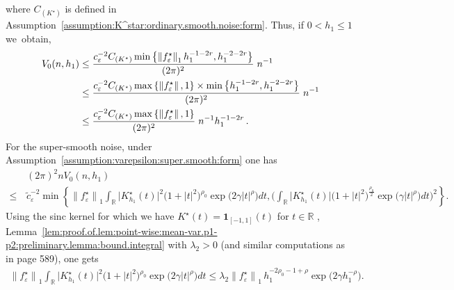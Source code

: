 \documentclass[11pt,a4paper,openany]{article}
\def\R{\mathbb{R}}
\def\r{{r}}
\begin{document}
where $C_{(K^{\star})}$ is defined in Assumption~\ref{assumption:K^star:ordinary.smooth.noise:form}. 
Thus, if $0  <  h_{1}  \leq  1$ we~obtain,   
\begin{align*}
	V_{0}(n,h_{1})  &\leq  \dfrac{   c_{\varepsilon}^{-2}     C_{(K^{\star})}  \min \left\{  \left\| f_{\varepsilon}^{\star}   \right\|_{1}   h_{1}^{-1-2r},    h_{1}^{-2-2r}    \right\}    }{(2\pi)^{2}}   \hspace{0.1cm}    n^{-1}     
	\\   
	&\leq  \dfrac{   c_{\varepsilon}^{-2}     C_{(K^{\star})}  \max \left\{  \left\| f_{\varepsilon}^{\star} \right\|, 1  \right\}  \times  \min \left\{  h_{1}^{-1-2r},    h_{1}^{-2-2r}    \right\}    }{(2\pi)^{2}} \hspace{0.1cm}  n^{-1}   
	\\   
	&\leq  \dfrac{   c_{\varepsilon}^{-2}     C_{(K^{\star})}  \max \left\{  \left\| f_{\varepsilon}^{\star} \right\|, 1  \right\}  }{(2\pi)^{2}} \hspace{0.1cm}  n^{-1} h_{1}^{-1 - 2\r} 
	\,   .                                                                                                                                                                       
\end{align*}
 For the super-smooth noise, under Assumption~\eqref{assumption:varepsilon:super.smooth:form} one has  
\begin{align*}
		&(2\pi)^{2}  n   V_{0}(n,h_{1}) 
		\\
		\leq  \,    &\widetilde{c}_{\varepsilon}^{-2} \min \left\{  \left\| f_{\varepsilon}^{\star} \right\|_{1}  \int_{\R} \big| K_{h_{1}}^{\star}(t) \big|^{2} \big( 1 + |t|^{ 2 } \big)^{\rho_{0}}  \exp \big(  2 \gamma |t|^{\rho}  \big)  dt,    
		\Big( \int_{\R} \big|  K_{h_{1}}^{\star}(t) \big|  \big( 1 + |t|^{ 2 } \big)^{ \frac{\rho_{0}}{2}}  \exp \big(  \gamma |t|^{\rho}  \big)  dt   \Big)^{2}   
		\right\}  .   
	\end{align*}    
Using the sinc  kernel for which we have  $K^{\star}(t) = \mathbf{1}_{[-1, 1]}(t)$  for $t \in \mathbb{R}$%
, Lemma~\ref{lem:proof.of.lem:point-wise:mean-var.p1-p2:preliminary.lemma:bound.integral} with $\lambda_{2} > 0$ (and similar computations as in \cite{Comte-Lacour} page 589), one gets   
\begin{align*}
	\left\| f_{\varepsilon}^{\star} \right\|_{1}  \int_{\R} \big| K_{h_{1}}^{\star}(t) \big|^{2} \big( 1 + |t|^{ 2 } \big)^{\rho_{0}}   \exp \big(  2 \gamma |t|^{\rho}  \big)  dt
\leq  \lambda_{2}    \left\| f_{\varepsilon}^{\star} \right\|_{1} \,     h_{1}^{-2\rho_{0} - 1 +  \rho} \exp \Big( 2 \gamma h_{1}^{-\rho} \Big).
\end{align*}
\end{document}
